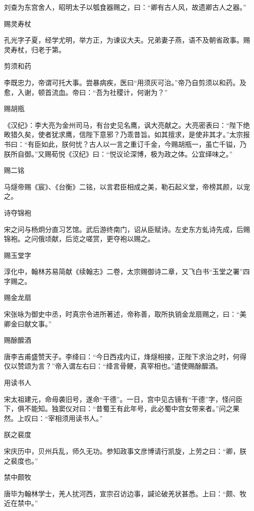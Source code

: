 \documentclass[a4paper,12pt,UTF8,twoside]{ctexbook}
\begin{document}
    刘查为东宫舍人，昭明太子以瓠食器赐之，曰：“卿有古人风，故遗卿古人之器。”
    
    赐灵寿杖
    
    孔光字子夏，经学尤明，举方正，为谏议大夫。兄弟妻子燕，语不及朝省政事。赐灵寿杖，归老于第。
    
    剪须和药
    
    李既忠力，帝谓可托大事。尝暴病疾，医曰“用须灰可治。”帝乃自剪须以和药。及愈，入谢，顿首流血。帝曰：“吾为社稷计，何谢为？”
    
    赐胡瓶
    
    《汉纪》：李大亮为金州司马，有台史见名鹰，讽大亮献之。大亮密表曰：“陛下绝畋猎久矣，使者犹求鹰，信陛下意邪？乃乖昔旨。如其擅求，是使非其才。”太宗报书曰：“有臣如此，朕何忧？古人以一言之重订千金，今赐胡瓶一，虽亡千镒，乃朕所自御。”又赐荀悦《汉纪》曰：“悦议论深博，极为政之体。公宜绎味之。”
    
    赐二铭
    
    马燧帝赐《宸》、《台衡》二铭，以言君臣相成之美，勒石起义堂，帝榜其颜，以宠之。
    
    诗夺锦袍
    
    宋之问与杨炯分直习艺馆。武后游终南门，诏从臣赋诗。左史东方虬诗先成，后赐锦袍。之问俄顷献，后览之嗟赏，更夺袍以赐之。
    
    赐玉堂字
    
    淳化中，翰林苏易简献《续翰志》二卷，太宗赐御诗二章，又飞白书“玉堂之署”四字赐之。
    
    赐金龙扇
    
    宋张咏为御史中丞，时真宗令进所著述，帝称善，取所执销金龙扇赐之，曰：“美卿金曰献文事。”
    
    赐酴醿酒
    
    唐李吉甫盛赞天子。李绛曰：“今日西戎内讧，烽燧相接，正陛下求治之时，何得仅以赞颂为言？”帝入谓左右曰：“绛言骨鲠，真宰相也。”遣使赐酴醿酒。
    
    用读书人
    
    宋太祖建元，命毋袭旧号，遂命“干德”。一日，宫中见古镜有“干德”字，怪问臣下，俱不能知。独窦仪对曰：“昔蜀王有此年号，此必蜀中宫女带来者。”问之果然。上叹曰：“宰相须用读书人。”
    
    朕之裴度
    
    宋庆历中，贝州兵乱，师久无功。参知政事文彦博请行凯旋，上劳之曰：“卿，朕之裴度也。”
    
    禁中颇牧
    
    唐毕为翰林学士，羌人扰河西，宣宗召访边事，諴论破羌状甚悉。上曰：“颇、牧近在禁中。”
    
\end{document}
